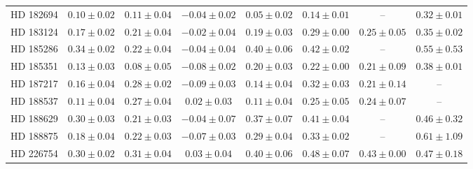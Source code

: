 \begin{table*}
\begin{tabular}{cccccccc}
HD 182694 & $0.10 \pm 0.02$ & $0.11 \pm 0.04$ & $-0.04 \pm 0.02$ & $0.05 \pm 0.02$ & $0.14 \pm 0.01$ & -- & $0.32 \pm 0.01$ \\
HD 183124 & $0.17 \pm 0.02$ & $0.21 \pm 0.04$ & $-0.02 \pm 0.04$ & $0.19 \pm 0.03$ & $0.29 \pm 0.00$ & $0.25 \pm 0.05$ & $0.35 \pm 0.02$ \\
HD 185286 & $0.34 \pm 0.02$ & $0.22 \pm 0.04$ & $-0.04 \pm 0.04$ & $0.40 \pm 0.06$ & $0.42 \pm 0.02$ & -- & $0.55 \pm 0.53$ \\
HD 185351 & $0.13 \pm 0.03$ & $0.08 \pm 0.05$ & $-0.08 \pm 0.02$ & $0.20 \pm 0.03$ & $0.22 \pm 0.00$ & $0.21 \pm 0.09$ & $0.38 \pm 0.01$ \\
HD 187217 & $0.16 \pm 0.04$ & $0.28 \pm 0.02$ & $-0.09 \pm 0.03$ & $0.14 \pm 0.04$ & $0.32 \pm 0.03$ & $0.21 \pm 0.14$ & -- \\
HD 188537 & $0.11 \pm 0.04$ & $0.27 \pm 0.04$ & $0.02 \pm 0.03$ & $0.11 \pm 0.04$ & $0.25 \pm 0.05$ & $0.24 \pm 0.07$ & -- \\
HD 188629 & $0.30 \pm 0.03$ & $0.21 \pm 0.03$ & $-0.04 \pm 0.07$ & $0.37 \pm 0.07$ & $0.41 \pm 0.04$ & -- & $0.46 \pm 0.32$ \\
HD 188875 & $0.18 \pm 0.04$ & $0.22 \pm 0.03$ & $-0.07 \pm 0.03$ & $0.29 \pm 0.04$ & $0.33 \pm 0.02$ & -- & $0.61 \pm 1.09$ \\
HD 226754 & $0.30 \pm 0.02$ & $0.31 \pm 0.04$ & $0.03 \pm 0.04$ & $0.40 \pm 0.06$ & $0.48 \pm 0.07$ & $0.43 \pm 0.00$ & $0.47 \pm 0.18$ \\
\hline
\end{tabular}
\end{table*}
